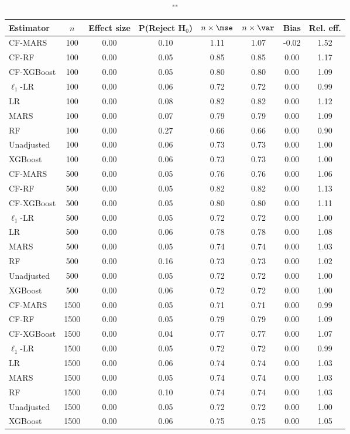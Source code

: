 \begin{table}
\centering
\caption{""}
\begin{tabular}{lccccccc}
\toprule
Estimator & $n$ & Effect size & P(Reject H$_0$) & $n\times\mse$ & $n\times \var$ & Bias & Rel. eff.\\ \midrule
CF-MARS & 100 & 0.00 & 0.10 & 1.11 & 1.07 & -0.02 & 1.52 \\ 
CF-RF & 100 & 0.00 & 0.05 & 0.85 & 0.85 &  0.00 & 1.17 \\ 
CF-XGBoost & 100 & 0.00 & 0.05 & 0.80 & 0.80 &  0.00 & 1.09 \\ 
$\ell_1$-LR & 100 & 0.00 & 0.06 & 0.72 & 0.72 &  0.00 & 0.99 \\ 
LR & 100 & 0.00 & 0.08 & 0.82 & 0.82 &  0.00 & 1.12 \\ 
MARS & 100 & 0.00 & 0.07 & 0.79 & 0.79 &  0.00 & 1.09 \\ 
RF & 100 & 0.00 & 0.27 & 0.66 & 0.66 &  0.00 & 0.90 \\ 
Unadjusted & 100 & 0.00 & 0.06 & 0.73 & 0.73 &  0.00 & 1.00 \\ 
XGBoost & 100 & 0.00 & 0.06 & 0.73 & 0.73 &  0.00 & 1.00 \\ \addlinespace 
CF-MARS & 500 & 0.00 & 0.05 & 0.76 & 0.76 &  0.00 & 1.06 \\ 
CF-RF & 500 & 0.00 & 0.05 & 0.82 & 0.82 &  0.00 & 1.13 \\ 
CF-XGBoost & 500 & 0.00 & 0.05 & 0.80 & 0.80 &  0.00 & 1.11 \\ 
$\ell_1$-LR & 500 & 0.00 & 0.05 & 0.72 & 0.72 &  0.00 & 1.00 \\ 
LR & 500 & 0.00 & 0.06 & 0.78 & 0.78 &  0.00 & 1.08 \\ 
MARS & 500 & 0.00 & 0.05 & 0.74 & 0.74 &  0.00 & 1.03 \\ 
RF & 500 & 0.00 & 0.16 & 0.73 & 0.73 &  0.00 & 1.02 \\ 
Unadjusted & 500 & 0.00 & 0.05 & 0.72 & 0.72 &  0.00 & 1.00 \\ 
XGBoost & 500 & 0.00 & 0.06 & 0.72 & 0.72 &  0.00 & 1.00 \\ \addlinespace 
CF-MARS & 1500 & 0.00 & 0.05 & 0.71 & 0.71 &  0.00 & 0.99 \\ 
CF-RF & 1500 & 0.00 & 0.05 & 0.79 & 0.79 &  0.00 & 1.09 \\ 
CF-XGBoost & 1500 & 0.00 & 0.04 & 0.77 & 0.77 &  0.00 & 1.07 \\ 
$\ell_1$-LR & 1500 & 0.00 & 0.05 & 0.72 & 0.72 &  0.00 & 0.99 \\ 
LR & 1500 & 0.00 & 0.06 & 0.74 & 0.74 &  0.00 & 1.03 \\ 
MARS & 1500 & 0.00 & 0.05 & 0.74 & 0.74 &  0.00 & 1.03 \\ 
RF & 1500 & 0.00 & 0.10 & 0.74 & 0.74 &  0.00 & 1.03 \\ 
Unadjusted & 1500 & 0.00 & 0.05 & 0.72 & 0.72 &  0.00 & 1.00 \\ 
XGBoost & 1500 & 0.00 & 0.06 & 0.75 & 0.75 &  0.00 & 1.05 \\
\bottomrule
\end{tabular}
\end{table}

